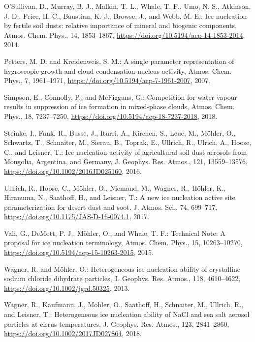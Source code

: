 \begin{thebibliography}{}
O'Sullivan, D., Murray, B. J., Malkin, T. L., Whale, T. F., Umo, N. S., Atkinson, J. D., Price, H. C., Baustian, K. J., Browse, J., and Webb, M. E.: Ice nucleation by fertile soil dusts: relative importance of mineral and biogenic components, Atmos. Chem. Phys., 14, 1853--1867, \url{https://doi.org/10.5194/acp-14-1853-2014}, 2014.

Petters, M. D. and Kreidenweis, S. M.: A single parameter representation of hygroscopic growth and cloud condensation nucleus activity, Atmos. Chem. Phys., 7, 1961--1971, \url{https://doi.org/10.5194/acp-7-1961-2007}, 2007.

Simpson, E., Connolly, P., and McFiggans, G.: Competition for water vapour results in suppression of ice formation in mixed-phase clouds, Atmos. Chem. Phys., 18, 7237--7250, \url{https://doi.org/10.5194/acp-18-7237-2018}, 2018.

Steinke, I., Funk, R., Busse, J., Iturri, A., Kirchen, S., Leue, M., M\"ohler, O., Schwartz, T., Schnaiter, M., Sierau, B., Toprak, E., Ullrich, R., Ulrich, A., Hoose, C., and Leisner, T.: Ice nucleation activity of agricultural soil dust aerosols from Mongolia, Argentina, and Germany, J. Geophys. Res. Atmos., 121, 13559--13576, \url{https://doi.org/10.1002/2016JD025160}, 2016.

Ullrich, R., Hoose, C., M\"ohler, O., Niemand, M., Wagner, R., H\"ohler, K., Hiranuma, N., Saathoff, H., and Leisner, T.: A new ice nucleation active site parameterization for desert dust and soot, J. Atmos. Sci., 74, 699--717, \url{https://doi.org/10.1175/JAS-D-16-0074.1}, 2017.

Vali, G., DeMott, P. J., M\"ohler, O., and Whale, T. F.: Technical Note: A proposal for ice nucleation terminology, Atmos. Chem. Phys., 15, 10263--10270, \url{https://doi.org/10.5194/acp-15-10263-2015}, 2015.

Wagner, R. and M\"ohler, O.: Heterogeneous ice nucleation ability of crystalline sodium chloride dihydrate particles, J. Geophys. Res. Atmos., 118, 4610--4622, \url{https://doi.org/10.1002/jgrd.50325}, 2013.

Wagner, R., Kaufmann, J., M\"ohler, O., Saathoff, H., Schnaiter, M., Ullrich, R., and Leisner, T.: Heterogeneous ice nucleation ability of NaCl and sea salt aerosol particles at cirrus temperatures, J. Geophys. Res. Atmos., 123, 2841--2860, \url{https://doi.org/10.1002/2017JD027864}, 2018.

\end{thebibliography}
